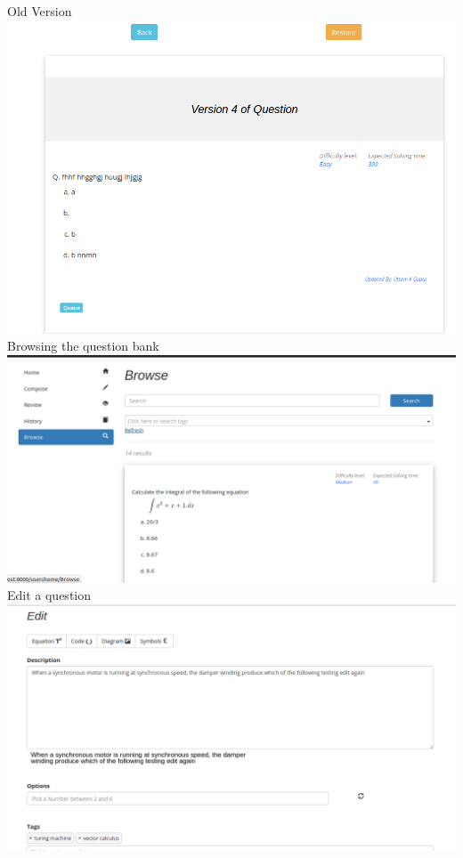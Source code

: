 \documentclass[a4paper,12pt,oneside]{book}
\begin{document}
Old Version\\
\includegraphics[scale=0.4]{version3.png}	\\

Browsing the question bank\\
\includegraphics[scale=0.3]{browse.png}	\\

\vspace{1in}
Edit a question \\
\includegraphics[scale=0.4]{edit.png}	\\
\end{document}
